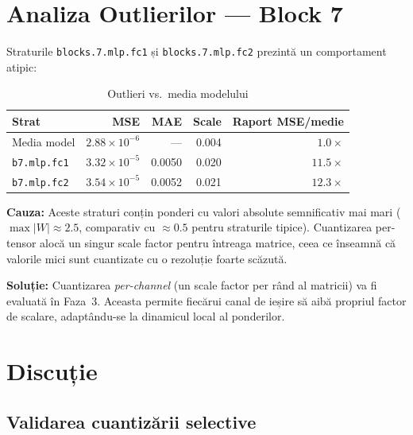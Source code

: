 \documentclass[12pt,a4paper]{article}
\begin{document}
\section{Analiza Outlierilor --- Block 7}

Straturile \texttt{blocks.7.mlp.fc1} și \texttt{blocks.7.mlp.fc2}
prezintă un comportament atipic:

\begin{table}[H]
  \centering
  \caption{Outlieri vs.\ media modelului}
  \begin{tabular}{lrrrr}
    \toprule
    \textbf{Strat} & \textbf{MSE} & \textbf{MAE} &
    \textbf{Scale} & \textbf{Raport MSE/medie} \\
    \midrule
    Media model & $2.88 \times 10^{-6}$ & --- & 0.004 & $1.0\times$ \\
    \texttt{b7.mlp.fc1} & $3.32 \times 10^{-5}$ & 0.0050 & 0.020 & $11.5\times$ \\
    \texttt{b7.mlp.fc2} & $3.54 \times 10^{-5}$ & 0.0052 & 0.021 & $12.3\times$ \\
    \bottomrule
  \end{tabular}
  \label{tab:block7_outliers}
\end{table}

\textbf{Cauza:} Aceste straturi conțin ponderi cu valori absolute
semnificativ mai mari ($\max|W| \approx 2.5$, comparativ cu $\approx 0.5$
pentru straturile tipice). Cuantizarea per-tensor alocă un singur scale
factor pentru întreaga matrice, ceea ce înseamnă că valorile mici sunt
cuantizate cu o rezoluție foarte scăzută.

\textbf{Soluție:} Cuantizarea \emph{per-channel} (un scale factor per rând
al matricii) va fi evaluată în Faza~3. Aceasta permite fiecărui canal de
ieșire să aibă propriul factor de scalare, adaptându-se la dinamicul local
al ponderilor.

\section{Discuție}

\subsection{Validarea cuantizării selective}
\end{document}
